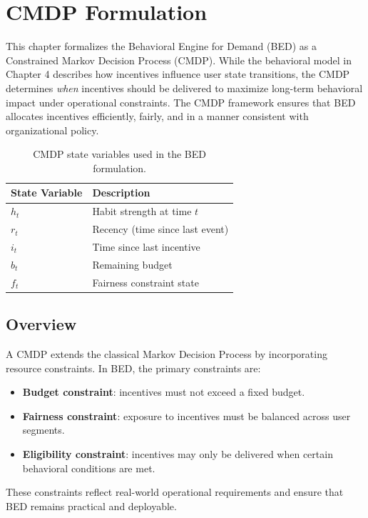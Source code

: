 \chapter{CMDP Formulation}

This chapter formalizes the Behavioral Engine for Demand (BED) as a Constrained
Markov Decision Process (CMDP). While the behavioral model in Chapter 4
describes how incentives influence user state transitions, the CMDP determines
\emph{when} incentives should be delivered to maximize long-term behavioral
impact under operational constraints. The CMDP framework ensures that BED
allocates incentives efficiently, fairly, and in a manner consistent with
organizational policy.
\begin{table}[h!]
\centering
\caption{CMDP state variables used in the BED formulation.}
\begin{tabular}{ll}
\toprule
\textbf{State Variable} & \textbf{Description} \\
\midrule
$h_t$ & Habit strength at time $t$ \\
$r_t$ & Recency (time since last event) \\
$i_t$ & Time since last incentive \\
$b_t$ & Remaining budget \\
$f_t$ & Fairness constraint state \\
\bottomrule
\end{tabular}
\label{tab:cmdp_state_variables}
\end{table}

\section{Overview}

A CMDP extends the classical Markov Decision Process by incorporating resource
constraints. In BED, the primary constraints are:

\begin{itemize}
    \item \textbf{Budget constraint}: incentives must not exceed a fixed budget.
    \item \textbf{Fairness constraint}: exposure to incentives must be balanced
    across user segments.
    \item \textbf{Eligibility constraint}: incentives may only be delivered when
    certain behavioral conditions are met.
\end{itemize}

These constraints reflect real-world operational requirements and ensure that
BED remains practical and deployable.

